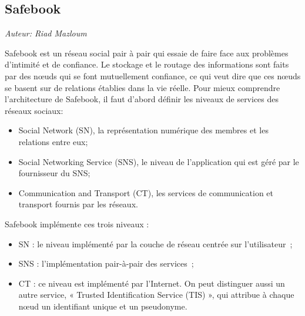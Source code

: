 \subsection{Safebook}

\begin{flushright}\textit{Auteur: Riad Mazloum}\end{flushright}

Safebook est un réseau social pair à pair qui essaie de faire face aux
problèmes d’intimité et de confiance. Le stockage et le routage des
informations sont faits par des nœuds qui se font mutuellement confiance, ce
qui veut dire que ces nœuds se basent sur de relations établies dans la vie
réelle. Pour mieux comprendre l’architecture de Safebook, il faut d’abord
définir les niveaux de services des réseaux sociaux:

\begin{itemize}
\item Social Network (SN), la représentation numérique des membres et les
relations entre eux;

\item Social Networking Service (SNS), le niveau de l’application qui est géré
par le fournisseur du SNS;

\item Communication and Transport (CT), les services de communication et
transport fournis par les réseaux.
\end{itemize}

Safebook implémente ces trois niveaux :

\begin{itemize}
\item SN : le niveau implémenté par la couche de réseau centrée sur
l’utilisateur ;

\item SNS : l’implémentation pair-à-pair des services ;

\item CT : ce niveau est implémenté par l’Internet. On peut distinguer aussi un
autre service, « Trusted Identification Service (TIS) », qui attribue à chaque
nœud un identifiant unique et un pseudonyme. 
\end{itemize}

